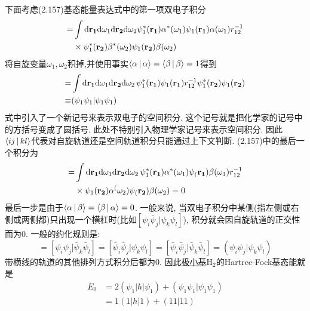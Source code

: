 下面考虑(2.157)基态能量表达式中的第一项双电子积分
\begin{align}
[{\psi_1\psi_1|\bar{\psi}_1\bar{\psi}_1}] = & \int\dd{r_1}\dd\omega_1\dd{r_2}\dd\omega_2\psi_1^*(\mathbf{r_1})\alpha^*(\omega_1)\psi_1(\mathbf{r_1})\alpha(\omega_1) r_{12}^{-1}\notag\\
&\times \psi_1^*(\mathbf{r_2})\beta^*(\omega_2)\psi_1(\mathbf{r_2})\beta(\omega_2)
\end{align}
将自旋变量$\omega_1,\omega_2$积掉,并使用事实$\Braket{\alpha|\alpha}=\Braket{\beta|\beta}=1$得到
\begin{align}
[{\psi_1\psi_1|\bar{\psi}_1\bar{\psi}_1}] = & \int\dd{r_1}\dd\omega_1\dd{r_2}\dd\omega_2\,\psi_1^*(\mathbf{r_1})\psi_1(\mathbf{r_1}) r_{12}^{-1}\psi_1^*(\mathbf{r_2})\psi_1(\mathbf{r_2})\notag\\
\equiv  &  (\psi_1\psi_1|\psi_1\psi_1) 
\end{align}
式中引入了一个新记号来表示双电子的空间积分. 这个记号就是把化学家的记号中的方括号变成了圆括号. 此处不特别引入物理学家记号来表示空间积分. 因此$\Braket{ij|kl}$代表对自旋轨道还是空间轨道积分只能通过上下文判断. (2.157)中的最后一个积分为
\begin{align}
[{\psi_1\bar{\psi}_1|\bar{\psi}_1\psi_1}] = & \int\dd{r_1}\dd\omega_1\dd{r_2}\dd\omega_2\, \psi_1^*(\mathbf{r_1})\alpha^*(\omega_1)\psi_(\mathbf{r_1})\beta(\omega_1)r_{12}^{-1}\notag\\
& \times \psi_1(\mathbf{r_2})\alpha^(\omega_2)\psi_(\mathbf{r_2})\beta(\omega_2) = 0
\end{align} 
最后一步是由于$\Braket{\alpha|\beta}=\Braket{\beta|\alpha} = 0$. 一般来说, 当双电子积分中某侧(指左侧或右侧或两侧都)只出现一个横杠时(比如$[\psi_i\bar{\psi}_j|\psi_k\psi_l]$), 积分就会因自旋轨道的正交性而为0. 一般的约化规则是:
\begin{equation}
[\psi_i\psi_j|\psi_k\psi_l] = 
[\psi_i\psi_j|\bar{\psi}_k\bar{\psi}_l] = [\bar{\psi}_i\bar{\psi}_j|\psi_k\psi_l] = [\bar{\psi}_i\bar{\psi}_j|\bar{\psi}_k\bar{\psi}_l] = (\psi_i\psi_j|\psi_k\psi_l)
\end{equation}
带横线的轨道的其他排列方式积分后都为0. 因此\underline{极小基$\mathrm{H}_2$}的Hartree-Fock基态能就是
\begin{align}
E_0 & = 2(\psi_1|h|\psi_1) + (\psi_1\psi_1|\psi_1\psi_1)\\
    & = 1(1|h|1) + (11|11)
\end{align} 
